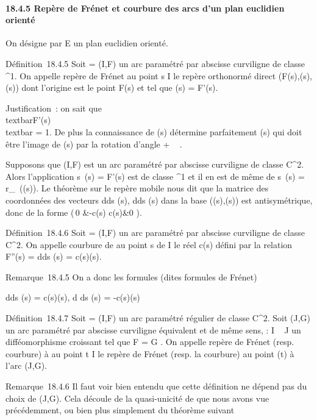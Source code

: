 \documentclass[]{article}
\begin{document}
\paragraph{18.4.5 Repère de Frénet et courbure des arcs d'un plan
euclidien orienté}

On désigne par E un plan euclidien orienté.

Définition~18.4.5 Soit \Gamma = (I,F) un arc paramétré par abscisse
curviligne de classe ^1. On appelle repère de Frénet au
point s \in I le repère orthonormé direct
(F(s),\vect(s),\vecn(s)) dont
l'origine est le point F(s) et tel que \vect(s) =
F'(s).

Justification~: on sait que
\\textbar{}F'(s)\\textbar{} = 1. De plus
la connaissance de \vect(s) détermine parfaitement
\vecn(s) qui doit être l'image de
\vect(s) par la rotation d'angle + \pi~
 .

Supposons que (I,F) est un arc paramétré par abscisse curviligne de
classe C^2. Alors l'application
s\mapsto~\vect(s) = F'(s) est de
classe ^1 et il en est de même de
s\mapsto~\vecn(s) =
r\_\pi~(\vect(s)). Le théorème sur le repère
mobile nous dit que la matrice des coordonnées des vecteurs 
d\vect \over ds (s),
d\vecn \over ds (s) dans la base
(\vect(s),\vecn(s)) est
antisymétrique, donc de la forme \left
(\matrix\,0 &-c(s) \cr
c(s)&0 \right ).

Définition~18.4.6 Soit \Gamma = (I,F) un arc paramétré par abscisse
curviligne de classe C^2. On appelle courbure de \Gamma au point s
de I le réel c(s) défini par la relation F''(s) =
d\vect \over ds (s) =
c(s)\vecn(s).

Remarque~18.4.5 On a donc les formules (dites formules de Frénet)

 d\vect \over ds (s) =
c(s)\vecn(s), d\vecn
\over ds (s) = -c(s)\vect(s)

Définition~18.4.7 Soit \Gamma = (I,F) un arc paramétré régulier de classe
C^2. Soit (J,G) un arc paramétré par abscisse curviligne
équivalent et de même sens, \theta : I \rightarrow~ J un difféomorphisme croissant tel
que F = G \cdot \theta. On appelle repère de Frénet (resp. courbure) à \Gamma au point
t \in I le repère de Frénet (resp. la courbure) au point \theta(t) à l'arc
(J,G).

Remarque~18.4.6 Il faut voir bien entendu que cette définition ne dépend
pas du choix de (J,G). Cela découle de la quasi-unicité de \theta que nous
avons vue précédemment, ou bien plus simplement du théorème suivant
\end{document}
